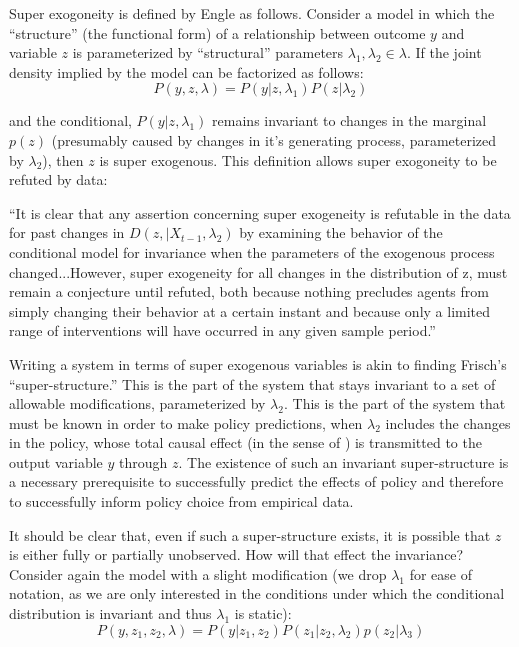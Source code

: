 \documentclass[a4paper,12pt]{article}
\begin{document}
Super exogoneity is defined by Engle as follows. Consider a model in which the ``structure'' (the functional form) of a relationship between outcome $y$ and variable $z$ is parameterized by ``structural'' parameters $\lambda_1, \lambda_2 \in \lambda$. If the joint density implied by the model can be factorized as follows: 
%
$$
P(y, z, \lambda) = P(y | z, \lambda_1)P(z | \lambda_2)
$$

and the conditional, $P(y | z, \lambda_1)$ remains invariant to changes in the marginal $p(z)$ (presumably caused by changes in it's generating process, parameterized by $\lambda_2$), then $z$ is super exogenous. This definition allows super exogoneity to be refuted by data:  

\begin{displayquote}
``It is clear that any assertion concerning super exogeneity is refutable in the data for past changes in $D(z, | X_{t-1}, \lambda_2)$ by examining the behavior of the conditional model for invariance when the parameters of the exogenous process changed...However, super exogeneity for all changes in the distribution of z, must remain a conjecture until refuted, both because nothing precludes agents from simply changing their behavior at a certain instant and because only a limited range of interventions will have occurred in any given sample period.''  
\end{displayquote}

Writing a system in terms of super exogenous variables is akin to finding Frisch's ``super-structure.'' This is the part of the system that stays invariant to a set of allowable modifications, parameterized by $\lambda_2$. This is the part of the system that must be known in order to make policy predictions, when $\lambda_2$ includes the changes in the policy, whose total causal effect (in the sense of \cite{Pearl2000}) is transmitted to the output variable $y$ through $z$. The existence of such an invariant super-structure is a necessary prerequisite to successfully predict the effects of policy and therefore to successfully inform policy choice from empirical data.

It should be clear that, even if such a super-structure exists, it is possible that $z$ is either fully or partially unobserved. How will that effect the invariance? Consider again the model with a slight modification (we drop $\lambda_1$ for ease of notation, as we are only interested in the conditions under which the conditional distribution is invariant and thus $\lambda_1$ is static):
%
$$
P(y, z_1, z_2, \lambda) = P(y | z_1, z_2)P(z_1 | z_2, \lambda_2)p(z_2 | \lambda_3)
$$
\end{document}
